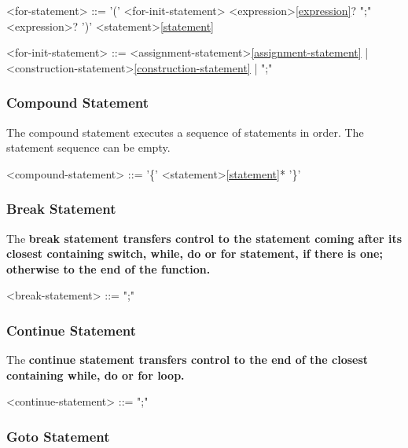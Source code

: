 \documentclass[a4paper,oneside,11pt]{article}
\begin{document}
\begin{grammar}
\label{for-statement}<for-statement> ::=  '(' <for-init-statement> <expression>\ref{expression}? ";" <expression>? ')' <statement>\ref{statement}

<for-init-statement> ::= <assignment-statement>\ref{assignment-statement} | <construction-statement>\ref{construction-statement} | ";"
\end{grammar}

\subsubsection{Compound Statement}

The compound statement executes a sequence of statements in order. The statement sequence can be empty.

\begin{grammar}
\label{compound-statement}<compound-statement> ::= '\{' <statement>\ref{statement}* '\}'
\end{grammar}

\subsubsection{Break Statement}

The \bf{break} statement transfers control to the statement coming after its closest containing \bf{switch}, \bf{while}, \bf{do} or \bf{for} statement,
if there is one; otherwise to the end of the function.

\begin{grammar}
\label{break-statement}<break-statement> ::=  ";"
\end{grammar}

\subsubsection{Continue Statement}

The \bf{continue} statement transfers control to the end of the closest containing \bf{while}, \bf{do} or \bf{for} loop.

\begin{grammar}
\label{continue-statement}<continue-statement> ::=  ";"
\end{grammar}

\subsubsection{Goto Statement}
\end{document}
